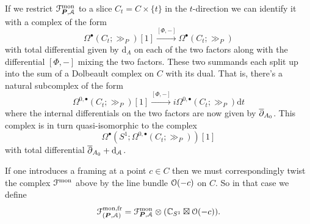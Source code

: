 \documentclass[10pt, oneside]{article}
\renewcommand{\d}{\mathrm{d}}
\begin{document}
\begin{remark} \label{monopole_holo_restriction_rmk}
If we restrict $\mathcal{F}^{\mathrm{mon}}_{\boldsymbol{P}, \mathcal{A}}$ to a slice $C_t = C \times \{t\}$ in the $t$-direction we can identify it with a complex of the form
\[\Omega^\bullet(C_t; \gg_P)[1] \overset {[\Phi,-]} \to \Omega^\bullet(C_t; \gg_P)\]
with total differential given by $\d_A$ on each of the two factors along with the differential $[\Phi,-]$ mixing the two factors.  These two summands each split up into the sum of a Dolbeault complex on $C$ with its dual.  That is, there's a natural subcomplex of the form
\[\Omega^{0,\bullet}(C_t; \gg_P)[1] \overset {[\Phi,-]} \to i \Omega^{0,\bullet}(C_t; \gg_P) \d t\]
where the internal differentials on the two factors are now given by $\overline{\partial}_{A_0}$.  This complex is in turn quasi-isomorphic to the complex
\[\Omega^\bullet(S^1; \Omega^{0,\bullet}(C_t;\gg_P))[1]\]
with total differential $\ol \dd_{A_0} + \d_{\mc A}$.

 
\end{remark}

\begin{remark}
If one introduces a framing at a point $c \in C$ then we must correspondingly twist the complex $\mathcal{F}^{\mathrm{mon}}$ above by the line bundle $\mathcal{O}(-c)$ on $C$.  So in that case we define 
\[\mathcal{F}^{\text{mon,fr}}_{(\boldsymbol{P},\mathcal{A})} = \mathcal{F}^{\mathrm{mon}}_{\boldsymbol{P}, \mathcal{A}} \otimes (\mathbb{C}_{S^1} \boxtimes \mathcal{O}(-c)).\]
\end{remark}
\end{document}
